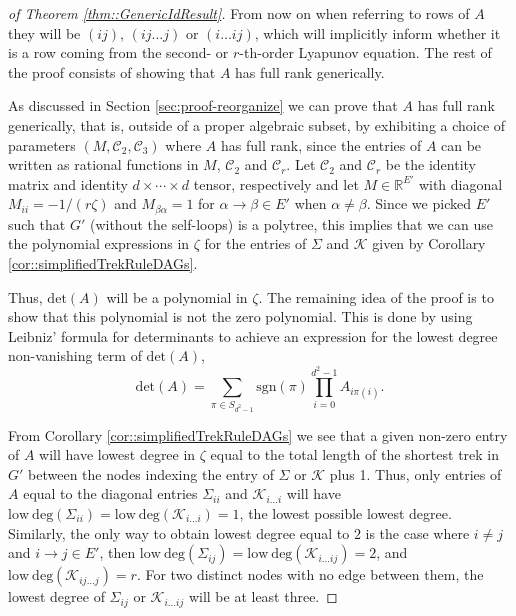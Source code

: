 \documentclass{biometrika}
\begin{document}
\begin{proof}[of Theorem \ref{thm::GenericIdResult}]
    From now on when referring to rows of $A$ they will be $(ij)$, $(ij \dots j)$ or $(i \dots ij)$, which will implicitly inform whether it is a row coming from the 
    second- or $r$-th-order Lyapunov equation. The rest of the proof consists of showing that $A$ has full rank generically. 

   

    As discussed in Section \ref{sec:proof-reorganize} we can prove that $A$ has full rank generically, that is, outside of a proper algebraic subset, by exhibiting a choice of parameters $(M, \mathcal{C}_2, \mathcal{C}_3)$ where $A$ has full rank, since the entries of $A$ can be written as rational functions in $M$, $\mathcal{C}_2$ and $\mathcal{C}_r$. 
    Let $\mathcal{C}_2$ and $\mathcal{C}_r$  be the identity matrix and identity $d \times \cdots \times d$ tensor, respectively and let $M \in \mathbb{R}^{E'}$ with diagonal $M_{ii} = -1/(r \zeta)$ and $M_{\beta \alpha} = 1$ for $\alpha \rightarrow \beta \in E'$ when $\alpha \neq \beta$. Since we picked $E'$ such that $G'$ (without the self-loops) is a polytree, this implies that we can use the polynomial expressions in $\zeta$ for the entries of $\Sigma$ and $\mathcal{K} $ given by Corollary \ref{cor::simplifiedTrekRuleDAGs}. 

   Thus, $\mathrm{det}(A)$ will be a polynomial in $\zeta$. The remaining idea of the proof is to show that this polynomial is not the zero polynomial. This is done by using Leibniz' formula for determinants to achieve an expression for the lowest degree non-vanishing term of $\mathrm{det}(A)$,
   \begin{equation}
   \label{eq::LeibnizFormula}
       \mathrm{det}(A) = \sum_{ \pi \in S_{d^2-1}} \mathrm{sgn}(\pi) \prod_{i = 0}^{d^2-1} A_{i \pi(i)}. 
   \end{equation}

    From Corollary \ref{cor::simplifiedTrekRuleDAGs} we see that a given non-zero entry of $A$ will have lowest degree in $\zeta$ equal to the total length of the shortest trek in $G'$ between the nodes indexing the entry of $\Sigma$ or $\mathcal{K} $ plus 1. Thus, only entries of $A$ equal to the diagonal entries $\Sigma_{ii}$ and $\mathcal{K} _{i \dots i}$ will have $\mathrm{low\ deg} ( \Sigma_{ii}) = \mathrm{low\ deg} ( \mathcal{K} _{i \dots i}) =  1 $, the lowest possible lowest degree. Similarly, the only way to obtain lowest degree equal to $2$ is the case where $i \neq j$ and $i \rightarrow j \in E'$, then $\mathrm{low\ deg} ( \Sigma_{ij}) = \mathrm{low\ deg} ( \mathcal{K} _{i \dots ij}) =  2 $, and $\mathrm{low\ deg} ( \mathcal{K} _{ij \dots j}) =  r $. For two distinct nodes with no edge between them, the lowest degree of $\Sigma_{ij}$ or $\mathcal{K} _{i \dots i j}$ will be at least three. 


\end{proof}
\end{document}
